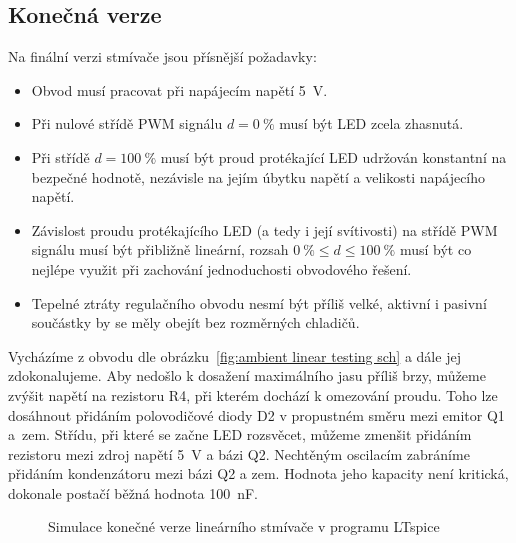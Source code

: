 \subsection{Konečná verze}
Na finální verzi stmívače jsou přísnější požadavky:
\begin{itemize}
    \item Obvod musí pracovat při napájecím napětí \SI{5}{\volt}.
    \item Při nulové střídě PWM signálu $d = \SI{0}{\percent}$ musí být LED
        zcela zhasnutá.
    \item Při střídě $d = \SI{100}{\percent}$ musí být proud protékající LED
        udržován konstantní na bezpečné hodnotě, nezávisle na jejím úbytku
        napětí a velikosti napájecího napětí.
    \item Závislost proudu protékajícího LED (a tedy i její svítivosti) na
        střídě PWM signálu musí být přibližně lineární, rozsah
        $\SI{0}{\percent} \le d \le \SI{100}{\percent}$ musí být co nejlépe
        využit při zachování jednoduchosti obvodového řešení.
    \item Tepelné ztráty regulačního obvodu nesmí být příliš velké, aktivní
        i pasivní součástky by se měly obejít bez rozměrných chladičů.
\end{itemize}

Vycházíme z obvodu dle obrázku~\vref{fig:ambient linear testing sch} a dále jej
zdokonalujeme. Aby nedošlo k dosažení maximálního jasu příliš brzy, můžeme
zvýšit napětí na rezistoru R4, při kterém dochází k omezování proudu. Toho lze
dosáhnout přidáním polovodičové diody D2 v propustném směru mezi emitor Q1
a~zem. Střídu, při které se začne LED rozsvěcet, můžeme zmenšit přidáním
rezistoru mezi zdroj napětí \SI{5}{\volt} a bázi Q2. Nechtěným oscilacím
zabráníme přidáním kondenzátoru mezi bázi Q2 a zem. Hodnota jeho kapacity není
kritická, dokonale postačí běžná hodnota \SI{100}{\nano\farad}.

\begin{figure}
    \centering
    \caption{Simulace konečné verze lineárního stmívače v programu LTspice}
    \label{fig:ambient linear prod sim}
\end{figure}

